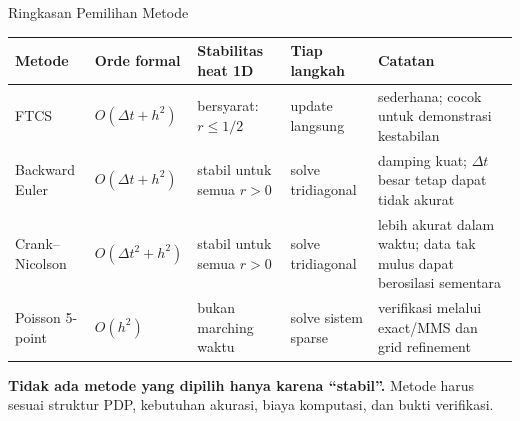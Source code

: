 \documentclass[aspectratio=169,10pt]{beamer}
\begin{document}
\begin{frame}{Ringkasan Pemilihan Metode}
\scriptsize
\begin{center}
\begin{tabular}{p{2.4cm}p{2.35cm}p{2.35cm}p{2.3cm}p{2.8cm}}
\toprule
Metode & Orde formal & Stabilitas heat 1D & Tiap langkah & Catatan\\
\midrule
FTCS & $O(\Delta t+h^2)$ & bersyarat: $r\le1/2$ & update langsung & sederhana; cocok untuk demonstrasi kestabilan\\
Backward Euler & $O(\Delta t+h^2)$ & stabil untuk semua $r>0$ & solve tridiagonal & damping kuat; $\Delta t$ besar tetap dapat tidak akurat\\
Crank--Nicolson & $O(\Delta t^2+h^2)$ & stabil untuk semua $r>0$ & solve tridiagonal & lebih akurat dalam waktu; data tak mulus dapat berosilasi sementara\\
Poisson 5-point & $O(h^2)$ & bukan marching waktu & solve sistem sparse & verifikasi melalui exact/MMS dan grid refinement\\
\bottomrule
\end{tabular}
\end{center}
\vspace{0.12cm}
\centering
\textbf{Tidak ada metode yang dipilih hanya karena ``stabil''.} Metode harus sesuai struktur PDP, kebutuhan akurasi, biaya komputasi, dan bukti verifikasi.
\end{frame}
\end{document}
